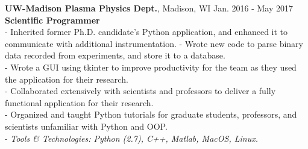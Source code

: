 \documentclass{resume}
\begin{document}
\begin{flushleft}
\textbf{UW-Madison Plasma Physics Dept.}, Madison, WI \hfill Jan. 2016 - May 2017 \\
\textbf{Scientific Programmer}\\
{\footnotesize
	\ttab- Inherited former Ph.D. candidate's Python application, and enhanced it to communicate with additional instrumentation.
	\ttab- Wrote new code to parse binary data recorded from experiments, and store it to a database. \\
	\ttab- Wrote a GUI using tkinter to improve productivity for the team as they used the application for their research. \\
	\ttab- Collaborated extensively with scientists and professors to deliver a fully functional application for their research. \\
	\ttab- Organized and taught Python tutorials for graduate students, professors, and scientists unfamiliar with Python and OOP. \\
	\ttab- \textit{Tools \& Technologies: Python (2.7), C++,  Matlab, MacOS, Linux.}\\[5mm]
}



\end{flushleft}
\end{document}
